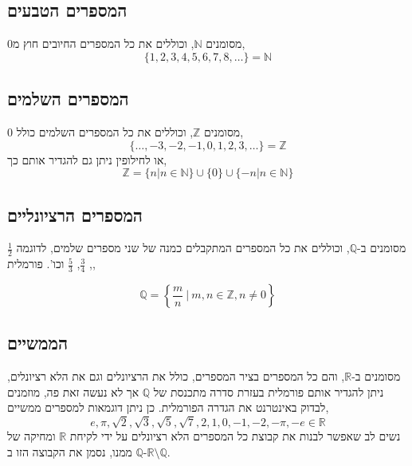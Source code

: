 \documentclass[a4paper,12pt]{article}
\begin{document}
\begin{RTL}
\subsection{המספרים הטבעים}
מסומנים $\mathbb{N}$, וכוללים את כל המספרים החיובים חוץ מ0, 
$$
\{1,2,3,4,5,6,7,8, \ldots\} = \mathbb{N}
$$

\subsection{המספרים השלמים}
מסומנים $\mathbb{Z}$, וכוללים את כל המספרים השלמים כולל 0,
$$
\{ \ldots, -3, -2, -1, 0, 1, 2, 3, \ldots \} = \mathbb{Z}
$$
או לחילופין ניתן גם להגדיר אותם כך,
$$
\mathbb{Z} = \{n | n \in \mathbb{N}\} \cup \{0\} \cup \{-n | n \in \mathbb{N}\}
$$

\subsection{המספרים הרציונליים} 
מסומנים ב-$\mathbb{Q}$, וכוללים את כל המספרים המתקבלים כמנה של שני מספרים שלמים, לדוגמה $\frac{1}{2}$, $\frac{3}{4}$, $\frac{5}{3}$ וכו'. פורמלית,

$$
\mathbb{Q} = \left\{ \frac{m}{n} \ \big | \  m,n \in \mathbb{Z}, n \neq 0 \right\}
$$

\subsection{הממשיים}
מסומנים ב-$\mathbb{R}$, והם כל המספרים בציר המספרים, כולל את הרציונלים וגם את הלא רציונלים, ניתן להגדיר אותם פורמלית בעזרת סדרה מתכנסת של $\mathbb{Q}$ אך לא נעשה זאת פה, מוזמנים לבדוק באינטרנט את הגדרה הפורמלית. כן ניתן דוגמאות למספרים ממשיים,
$$
e, \pi, \sqrt{2}, \sqrt{3}, \sqrt{5}, \sqrt{7}, 2 , 1 , 0, -1, -2, -\pi, -e \in \mathbb{R}
$$
נשים לב שאפשר לבנות את קבוצת כל המספרים הלא רציונלים על ידי לקיחת $\mathbb{R}$ ומחיקה של $\mathbb{Q}$ ממנו, נסמן את הקבוצה הזו ב-$\mathbb{R} \setminus \mathbb{Q}$.


\end{RTL}
\end{document}

